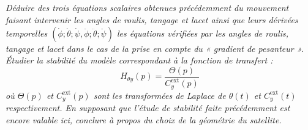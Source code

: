   \subparagraph{\label{q_12}}\textit{Déduire des trois équations scalaires obtenues précédemment du mouvement faisant
  intervenir les angles de roulis, tangage et lacet \triplet{\phi}{\theta}{\psi} ainsi que leurs dérivées temporelles $\left(\dot{\phi};\dot{\theta};\dot{\psi},\ddot{\phi};\ddot{\theta};\ddot{\psi}\right)$ les équations vérifiées
  par les angles de roulis, tangage et lacet dans le cas de la prise en
  compte du « gradient de pesanteur ». Étudier la stabilité du modèle
  correspondant à la fonction de transfert :}
    $$
  H_{\theta y}(p)=\dfrac{\Theta(p)}{C_y^{\text{ext}}(p)}
  $$
\textit{  où $\Theta(p)$ et $C_y^{\text{ext}}(p)$ sont les transformées de Laplace de $\theta(t)$ et $C_y^{\text{ext}}(t)$ respectivement. En
  supposant que l'étude de stabilité faite précédemment est encore
  valable ici, conclure à propos du choix de la géométrie du satellite.}
  \ifprof
